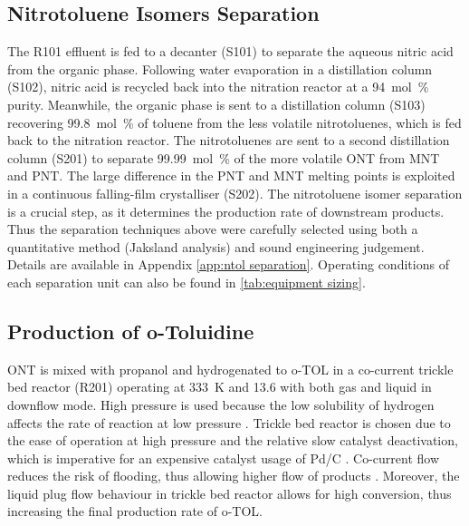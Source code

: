 
\subsection{Nitrotoluene Isomers Separation}
The R101 effluent is fed to a decanter (S101) to separate the aqueous nitric acid from the organic phase. Following water evaporation in a distillation column (S102), nitric acid is recycled back into the nitration reactor at a \SI{94}{mol\percent} purity.
Meanwhile, the organic phase is sent to a distillation column (S103) recovering \SI{99.8}{mol\percent} of toluene from the less volatile nitrotoluenes, which is fed back to the nitration reactor. The nitrotoluenes are sent to a second distillation column (S201) to separate \SI{99.99}{mol\percent} of the more volatile ONT from MNT and PNT. The large difference in the PNT and MNT melting points is exploited in a continuous falling-film crystalliser (S202). 
The nitrotoluene isomer separation is a crucial step, as it determines the production rate of downstream products. Thus the separation techniques above were carefully selected using both a quantitative method (Jaksland analysis) \cite{jaksland_separation_1995} and sound engineering judgement. Details are available in Appendix \ref{app:ntol separation}. Operating conditions of each separation unit can also be found in \cref{tab:equipment sizing}. 

\subsection{Production of o-Toluidine}
ONT is mixed with propanol and hydrogenated to o-TOL in a co-current trickle bed reactor (R201) operating at \SI{333}{\K} and \SI{13.6}{\atm} with both gas and liquid in downflow mode. High pressure is used because the low solubility of hydrogen affects the rate of reaction at low pressure \cite{rajadhyaksha_solvent_1986}. Trickle bed reactor is chosen due to the ease of operation at high pressure and the relative slow catalyst deactivation, which is imperative for an expensive catalyst usage of Pd/C \cite{vemala_hydrodynamic_nodate}. Co-current flow reduces the risk of flooding, thus allowing higher flow of products \cite{vemala_hydrodynamic_nodate}. Moreover, the liquid plug flow behaviour in trickle bed reactor allows for high conversion, thus increasing the final production rate of o-TOL. 

